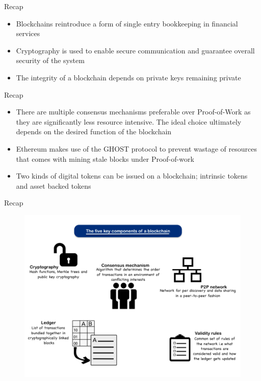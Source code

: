 \documentclass[11pt]{beamer}
\begin{document}


\begin{frame}{Recap}
	\begin{itemize}
		\item Blockchains reintroduce a form of single entry bookkeeping in financial services
		\item Cryptography is used to enable secure communication and guarantee overall security of the system
		\item The integrity of a blockchain depends on private keys remaining private
	\end{itemize}
\end{frame}


\begin{frame}{Recap}
	\begin{itemize}
		\item There are multiple consensus mechanisms preferable over Proof-of-Work as they are significantly less resource intensive. The ideal choice ultimately depends on the desired function of the blockchain
		\item Ethereum makes use of the GHOST protocol to prevent wastage of resources that comes with mining stale blocks under Proof-of-work
		\item Two kinds of digital tokens can be issued on a blockchain; intrinsic tokens and asset backed tokens
	\end{itemize}
\end{frame}


\begin{frame}{Recap}
	\begin{figure}[]
		\centering
		\includegraphics  [scale=0.3]{Images/block-key}
	\end{figure}
\end{frame}
\end{document}
